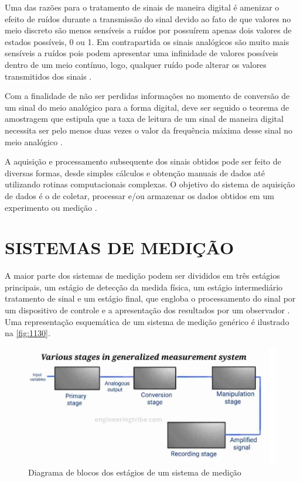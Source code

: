 Uma das razões para o tratamento de sinais de maneira digital é amenizar o efeito de ruídos durante a transmissão do sinal devido ao fato de que valores no meio discreto
são menos sensíveis a ruídos por possuírem apenas dois valores de estados possíveis, 0 ou 1.
Em contrapartida os sinais analógicos são muito mais sensíveis a ruídos pois podem apresentar uma infinidade de valores possíveis dentro de um meio contínuo,
logo, qualquer ruído pode alterar os valores transmitidos dos sinais \autocite{Hollman2011}.

Com a finalidade de não ser perdidas informações no momento de conversão de um sinal do meio analógico para a forma digital, deve ser seguido o teorema de amostragem que estipula
que a taxa de leitura de um sinal de maneira digital necessita ser pelo menos duas vezes o valor da frequência máxima desse sinal no meio analógico \autocite{Hollman2011}.

A aquisição e processamento subsequente dos sinais obtidos pode ser feito de diversas formas, desde simples cálculos e obtenção manuais de dados até utilizando
rotinas computacionais complexas. O objetivo do sistema de aquisição de dados é o de coletar, processar e/ou armazenar os dados obtidos em um experimento ou medição
\autocite{Hollman2011}.

\section{SISTEMAS DE MEDIÇÃO}

A maior parte dos sistemas de medição podem ser divididos em três estágios principais, um estágio de detecção da medida física, um estágio intermediário tratamento de sinal e um estágio final,
que engloba o processamento do sinal por um dispositivo de controle e a apresentação dos resultados por um observador \autocite{Hollman2011}.
Uma representação esquemática de um sistema de medição genérico é ilustrado na \autoref{fig:1130}.

\begin{figure}[htb]
	\caption{\label{fig:1130} Diagrama de blocos dos estágios de um sistema de medição}
	\begin{center}
		\includegraphics[width=\textwidth]{pictures/1130.png}
	\end{center}
\end{figure}

